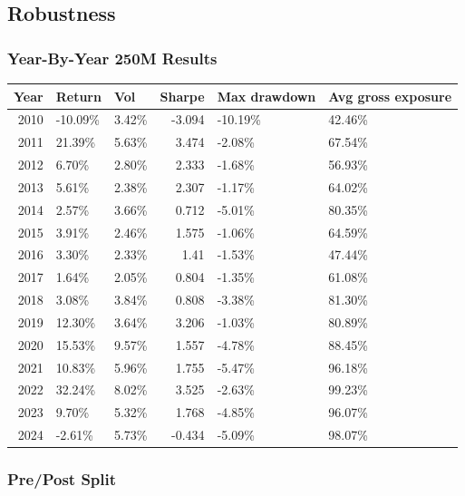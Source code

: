 \documentclass[
  10pt,
]{article}
\begin{document}
\hypertarget{robustness}{%
\subsection{Robustness}\label{robustness}}

\hypertarget{year-by-year-250m-results}{%
\subsubsection{Year-By-Year 250M
Results}\label{year-by-year-250m-results}}

\begin{longtable}[]{@{}rllrll@{}}
\toprule
Year & Return & Vol & Sharpe & Max drawdown & Avg gross exposure \\
\midrule
\endhead
2010 & -10.09\% & 3.42\% & -3.094 & -10.19\% & 42.46\% \\
2011 & 21.39\% & 5.63\% & 3.474 & -2.08\% & 67.54\% \\
2012 & 6.70\% & 2.80\% & 2.333 & -1.68\% & 56.93\% \\
2013 & 5.61\% & 2.38\% & 2.307 & -1.17\% & 64.02\% \\
2014 & 2.57\% & 3.66\% & 0.712 & -5.01\% & 80.35\% \\
2015 & 3.91\% & 2.46\% & 1.575 & -1.06\% & 64.59\% \\
2016 & 3.30\% & 2.33\% & 1.41 & -1.53\% & 47.44\% \\
2017 & 1.64\% & 2.05\% & 0.804 & -1.35\% & 61.08\% \\
2018 & 3.08\% & 3.84\% & 0.808 & -3.38\% & 81.30\% \\
2019 & 12.30\% & 3.64\% & 3.206 & -1.03\% & 80.89\% \\
2020 & 15.53\% & 9.57\% & 1.557 & -4.78\% & 88.45\% \\
2021 & 10.83\% & 5.96\% & 1.755 & -5.47\% & 96.18\% \\
2022 & 32.24\% & 8.02\% & 3.525 & -2.63\% & 99.23\% \\
2023 & 9.70\% & 5.32\% & 1.768 & -4.85\% & 96.07\% \\
2024 & -2.61\% & 5.73\% & -0.434 & -5.09\% & 98.07\% \\
\bottomrule
\end{longtable}

\hypertarget{prepost-split}{%
\subsubsection{Pre/Post Split}\label{prepost-split}}
\end{document}
